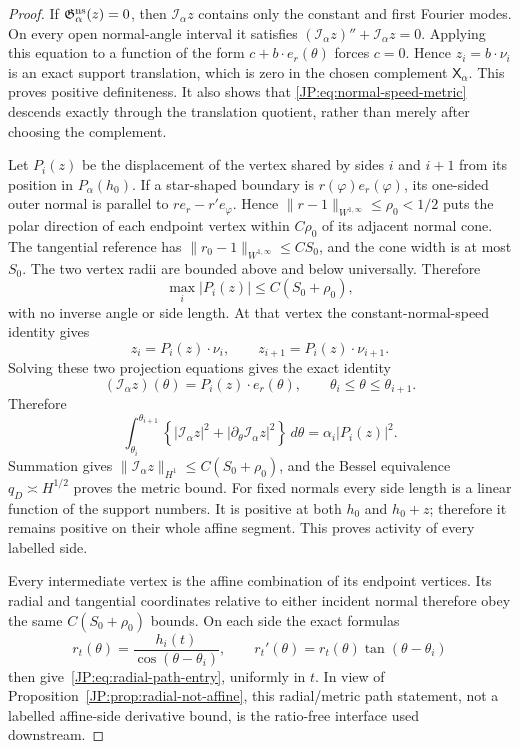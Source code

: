 \begin{proof}
If $\mathfrak G_\alpha^{\rm ns}(z)=0$, then
$\mathcal I_\alpha z$ contains only the constant and first Fourier modes.
On every open normal-angle interval it satisfies
$(\mathcal I_\alpha z)''+\mathcal I_\alpha z=0$.  Applying this equation
to a function of the form $c+b\cdot e_r(\theta)$ forces $c=0$.  Hence
$z_i=b\cdot\nu_i$ is an exact support translation, which is zero in the
chosen complement $\mathsf X_\alpha$.  This proves positive definiteness.
It also shows that \eqref{JP:eq:normal-speed-metric} descends exactly through
the translation quotient, rather than merely after choosing the complement.

Let $P_i(z)$ be the displacement of the vertex shared by sides $i$ and
$i+1$ from its position in $P_\alpha(h_0)$.  If a star-shaped boundary is
$r(\varphi)e_r(\varphi)$, its one-sided outer normal is parallel to
$r e_r-r'e_\varphi$.  Hence $\|r-1\|_{W^{1,\infty}}\le\rho_0<1/2$
puts the polar direction of each endpoint vertex within $C\rho_0$ of
its adjacent normal cone.  The tangential reference has
$\|r_0-1\|_{W^{1,\infty}}\le CS_0$, and the cone width is at most $S_0$.
The two vertex radii are bounded above and below universally.  Therefore
\begin{equation}\label{JP:eq:vertex-displacement-radial}
 \max_i|P_i(z)|\le C(S_0+\rho_0),
\end{equation}
with no inverse angle or side length.  At that vertex the
constant-normal-speed identity gives
\[
 z_i=P_i(z)\cdot\nu_i,\qquad
 z_{i+1}=P_i(z)\cdot\nu_{i+1}.
\]
Solving these two projection equations gives the exact identity
\[
 (\mathcal I_\alpha z)(\theta)=P_i(z)\cdot e_r(\theta),
 \qquad \theta_i\le\theta\le\theta_{i+1}.
\]
Therefore
\[
 \int_{\theta_i}^{\theta_{i+1}}
 \left\{|\mathcal I_\alpha z|^2
       +|\partial_\theta\mathcal I_\alpha z|^2\right\}\,d\theta
 =\alpha_i|P_i(z)|^2.
\]
Summation gives
$\|\mathcal I_\alpha z\|_{H^1}\le C(S_0+\rho_0)$, and the
Bessel equivalence $q_D\asymp H^{1/2}$ proves the metric bound.  For fixed
normals every side length is a linear function of the support numbers.
It is positive at both $h_0$ and $h_0+z$; therefore it remains positive on
their whole affine segment.  This proves activity of every labelled side.

Every intermediate vertex is the affine combination of its endpoint
vertices.  Its radial and tangential coordinates relative to either
incident normal therefore obey the same $C(S_0+\rho_0)$ bounds.  On each
side the exact formulas
\[
 r_t(\theta)=\frac{h_i(t)}{\cos(\theta-\theta_i)},
 \qquad
 r_t'(\theta)=r_t(\theta)\tan(\theta-\theta_i)
\]
then give~\eqref{JP:eq:radial-path-entry}, uniformly in $t$.  In view of
Proposition~\ref{JP:prop:radial-not-affine}, this radial/metric path statement,
not a labelled affine-side derivative bound, is the ratio-free interface
used downstream.
\end{proof}

